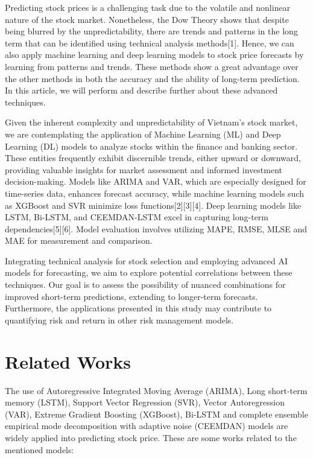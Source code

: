 \documentclass{ieeeojies}
\begin{document}
\label{sec:introduction}

Predicting stock prices is a challenging task due to the volatile and nonlinear nature of the stock market. Nonetheless, the Dow Theory shows that despite being blurred by the unpredictability, there are trends and patterns in the long term that can be identified using technical analysis methods[1]. Hence, we can also apply machine learning and deep learning models to stock price forecasts by learning from patterns and trends. These methods show a great advantage over the other methods in both the accuracy and the ability of long-term prediction. In this article, we will perform and describe further about these advanced techniques. 

Given the inherent complexity and unpredictability of Vietnam's stock market, we are contemplating the application of Machine Learning (ML) and Deep Learning (DL) models to analyze stocks within the finance and banking sector. These entities frequently exhibit discernible trends, either upward or downward, providing valuable insights for market assessment and informed investment decision-making. Models like ARIMA and VAR, which are especially designed for time-series data, enhances forecast accuracy, while machine learning models such as XGBoost and SVR minimize loss functions[2][3][4]. Deep learning models like LSTM, Bi-LSTM, and CEEMDAN-LSTM excel in capturing long-term dependencies[5][6]. Model evaluation involves utilizing MAPE, RMSE, MLSE and MAE for measurement and comparison.

Integrating technical analysis for stock selection and employing advanced AI models for forecasting, we aim to explore potential correlations between these techniques. Our goal is to assess the possibility of nuanced combinations for improved short-term predictions, extending to longer-term forecasts. Furthermore, the applications presented in this study may contribute to quantifying risk and return in other risk management models.

\section{Related Works}
The use of Autoregressive Integrated Moving Average (ARIMA), Long short-term memory (LSTM), Support Vector Regression (SVR), Vector Autoregression (VAR), Extreme Gradient Boosting (XGBoost), Bi-LSTM and complete ensemble empirical mode decomposition with adaptive noise (CEEMDAN) models are widely applied into predicting stock price. 
These are some works related to the mentioned models:
\end{document}
